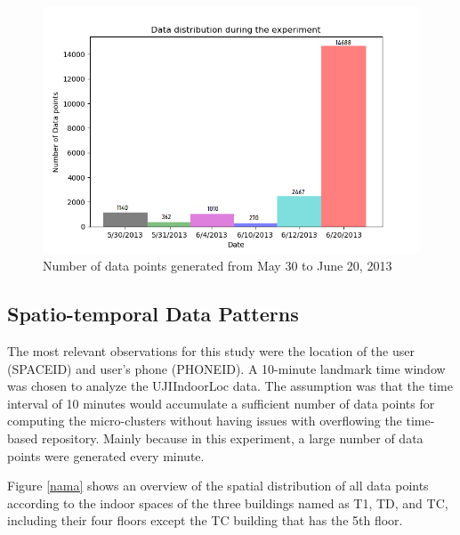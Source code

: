 \begin{figure}[!ht]
    \centering
    \includegraphics[width = 12 cm]{image/Chapters/Chapter6/timedist.png}
    \caption{Number of data points generated from May 30 to June 20, 2013}
    \label{timeline}
\end{figure}

\subsection{Spatio-temporal Data Patterns}

The most relevant observations for this study were the location of the user (SPACEID) and user's phone (PHONEID). A 10-minute landmark time window was chosen to analyze the UJIIndoorLoc data. The assumption was that the time interval of 10 minutes would accumulate a sufficient number of data points for computing the micro-clusters without having issues with overflowing the time-based repository. Mainly because in this experiment, a large number of data points were generated every minute.

Figure \ref{nama} shows an overview of the spatial distribution of all data points according to the indoor spaces of the three buildings named as T1, TD, and TC, including their four floors except the TC  building that has the 5th floor. 

